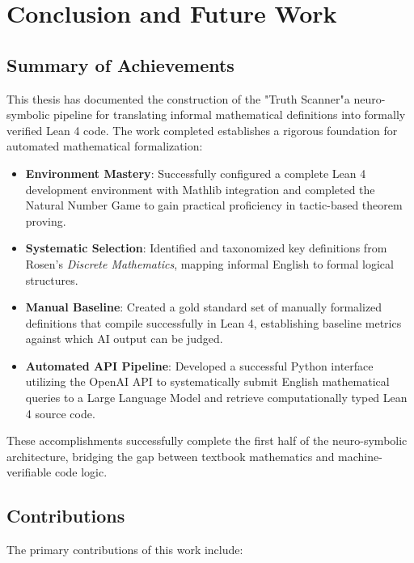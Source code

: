 \chapter{Conclusion and Future Work}
\label{chap:Five}

\section{Summary of Achievements}
\label{sec:summary}

This thesis has documented the construction of the "Truth Scanner"\textemdash a neuro-symbolic pipeline for translating informal mathematical definitions into formally verified Lean 4 code. The work completed establishes a rigorous foundation for automated mathematical formalization:

\begin{itemize}
    \item \textbf{Environment Mastery}: Successfully configured a complete Lean 4 development environment with Mathlib integration and completed the Natural Number Game to gain practical proficiency in tactic-based theorem proving.
    \item \textbf{Systematic Selection}: Identified and taxonomized key definitions from Rosen's \textit{Discrete Mathematics}, mapping informal English to formal logical structures.
    \item \textbf{Manual Baseline}: Created a gold standard set of manually formalized definitions that compile successfully in Lean 4, establishing baseline metrics against which AI output can be judged.
    \item \textbf{Automated API Pipeline}: Developed a successful Python interface utilizing the OpenAI API to systematically submit English mathematical queries to a Large Language Model and retrieve computationally typed Lean 4 source code.
\end{itemize}

These accomplishments successfully complete the first half of the neuro-symbolic architecture, bridging the gap between textbook mathematics and machine-verifiable code logic.

\section{Contributions}
\label{sec:contributions}

The primary contributions of this work include:

